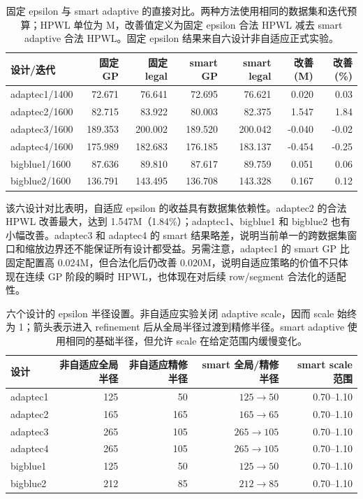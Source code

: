 \documentclass[11pt,a4paper]{ctexart}
\begin{document}
\begin{table}[H]
\centering
\small
\caption{固定 epsilon 与 smart adaptive 的直接对比。两种方法使用相同的数据集和迭代预算；HPWL 单位为 M，改善值定义为固定 epsilon 合法 HPWL 减去 smart adaptive 合法 HPWL。固定 epsilon 结果来自六设计非自适应正式实验。}
\begin{tabular}{lrrrrrr}
\toprule
设计/迭代 & 固定 GP & 固定 legal & smart GP & smart legal & 改善(M) & 改善(\%)\\
\midrule
adaptec1/1400 & 72.671 & 76.641 & 72.695 & 76.621 & 0.020 & 0.03\\
adaptec2/1600 & 82.715 & 83.922 & 80.003 & 82.375 & 1.547 & 1.84\\
adaptec3/1600 & 189.353 & 200.002 & 189.520 & 200.042 & -0.040 & -0.02\\
adaptec4/1600 & 175.989 & 182.683 & 176.185 & 183.137 & -0.454 & -0.25\\
bigblue1/1600 & 87.636 & 89.810 & 87.617 & 89.759 & 0.051 & 0.06\\
bigblue2/1600 & 136.791 & 143.495 & 136.708 & 143.328 & 0.167 & 0.12\\
\bottomrule
\end{tabular}
\end{table}

该六设计对比表明，自适应 epsilon 的收益具有数据集依赖性。adaptec2 的合法 HPWL 改善最大，达到 1.547M（1.84\%）；adaptec1、bigblue1 和 bigblue2 也有小幅改善。adaptec3 和 adaptec4 的 smart 结果略差，说明当前单一的跨数据集窗口和缩放边界还不能保证所有设计都受益。另需注意，adaptec1 的 smart GP 比固定配置高 0.024M，但合法化后仍改善 0.020M，说明自适应策略的价值不只体现在连续 GP 阶段的瞬时 HPWL，也体现在对后续 row/segment 合法化的适配性。

\begin{table}[H]
\centering
\small
\caption{六个设计的 epsilon 半径设置。非自适应实验关闭 adaptive scale，因而 scale 始终为 1；箭头表示进入 refinement 后从全局半径过渡到精修半径。smart adaptive 使用相同的基础半径，但允许 scale 在给定范围内缓慢变化。}
\begin{tabular}{lrrrr}
\toprule
设计 & 非自适应全局半径 & 非自适应精修半径 & smart 全局/精修半径 & smart scale 范围\\
\midrule
adaptec1 & 125 & 50 & $125\rightarrow50$ & 0.70--1.10\\
adaptec2 & 165 & 165 & $165\rightarrow65$ & 0.70--1.10\\
adaptec3 & 265 & 105 & $265\rightarrow105$ & 0.70--1.10\\
adaptec4 & 265 & 105 & $265\rightarrow105$ & 0.70--1.10\\
bigblue1 & 125 & 50 & $125\rightarrow50$ & 0.70--1.10\\
bigblue2 & 212 & 85 & $212\rightarrow85$ & 0.70--1.10\\
\bottomrule
\end{tabular}
\end{table}
\end{document}

